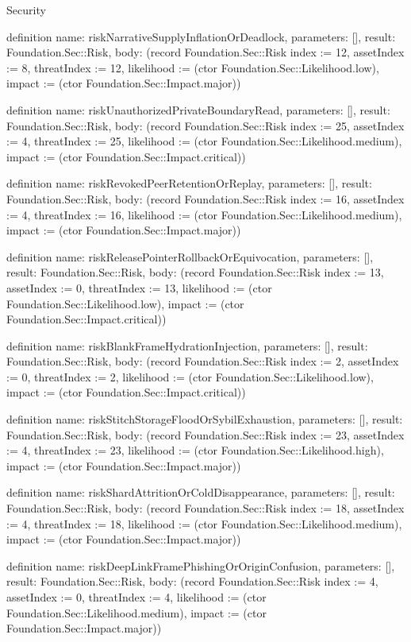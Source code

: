 \begin{lexlean}{Security}
\begin{semanticmodule}
definition{
  name: riskNarrativeSupplyInflationOrDeadlock,
  parameters: [],
  result: Foundation.Sec::Risk,
  body: (record Foundation.Sec::Risk {index := 12, assetIndex := 8, threatIndex := 12, likelihood := (ctor Foundation.Sec::Likelihood.low), impact := (ctor Foundation.Sec::Impact.major)})
}

definition{
  name: riskUnauthorizedPrivateBoundaryRead,
  parameters: [],
  result: Foundation.Sec::Risk,
  body: (record Foundation.Sec::Risk {index := 25, assetIndex := 4, threatIndex := 25, likelihood := (ctor Foundation.Sec::Likelihood.medium), impact := (ctor Foundation.Sec::Impact.critical)})
}

definition{
  name: riskRevokedPeerRetentionOrReplay,
  parameters: [],
  result: Foundation.Sec::Risk,
  body: (record Foundation.Sec::Risk {index := 16, assetIndex := 4, threatIndex := 16, likelihood := (ctor Foundation.Sec::Likelihood.medium), impact := (ctor Foundation.Sec::Impact.major)})
}

definition{
  name: riskReleasePointerRollbackOrEquivocation,
  parameters: [],
  result: Foundation.Sec::Risk,
  body: (record Foundation.Sec::Risk {index := 13, assetIndex := 0, threatIndex := 13, likelihood := (ctor Foundation.Sec::Likelihood.low), impact := (ctor Foundation.Sec::Impact.critical)})
}

definition{
  name: riskBlankFrameHydrationInjection,
  parameters: [],
  result: Foundation.Sec::Risk,
  body: (record Foundation.Sec::Risk {index := 2, assetIndex := 0, threatIndex := 2, likelihood := (ctor Foundation.Sec::Likelihood.low), impact := (ctor Foundation.Sec::Impact.critical)})
}

definition{
  name: riskStitchStorageFloodOrSybilExhaustion,
  parameters: [],
  result: Foundation.Sec::Risk,
  body: (record Foundation.Sec::Risk {index := 23, assetIndex := 4, threatIndex := 23, likelihood := (ctor Foundation.Sec::Likelihood.high), impact := (ctor Foundation.Sec::Impact.major)})
}

definition{
  name: riskShardAttritionOrColdDisappearance,
  parameters: [],
  result: Foundation.Sec::Risk,
  body: (record Foundation.Sec::Risk {index := 18, assetIndex := 4, threatIndex := 18, likelihood := (ctor Foundation.Sec::Likelihood.medium), impact := (ctor Foundation.Sec::Impact.major)})
}

definition{
  name: riskDeepLinkFramePhishingOrOriginConfusion,
  parameters: [],
  result: Foundation.Sec::Risk,
  body: (record Foundation.Sec::Risk {index := 4, assetIndex := 0, threatIndex := 4, likelihood := (ctor Foundation.Sec::Likelihood.medium), impact := (ctor Foundation.Sec::Impact.major)})
}


\end{semanticmodule}
\end{lexlean}
